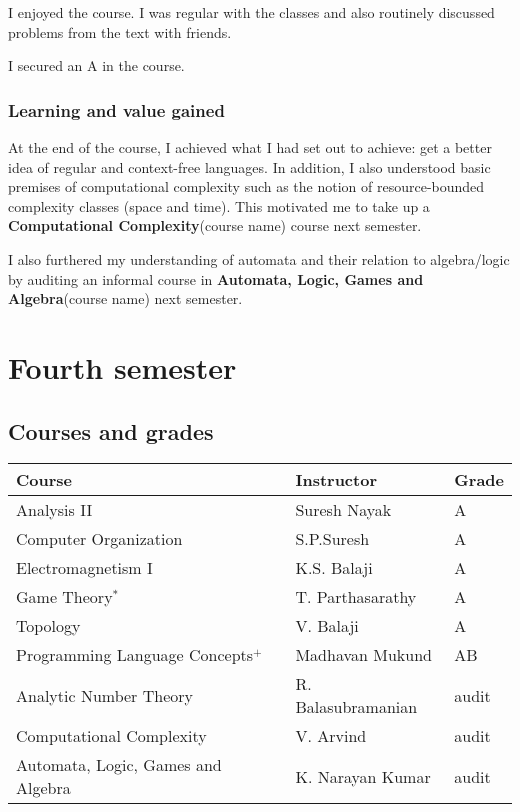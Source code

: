 \documentclass[a4paper]{amsart}
\newcommand{\coursename}[1]{{\bf #1}{\small{(course name)}}}
\begin{document}
I enjoyed the course. I was regular with the classes and also
routinely discussed problems from the text with friends.

I secured an A in the course.

\subsubsection{Learning and value gained}

At the end of the course, I achieved what I had set out to achieve:
get a better idea of regular and context-free languages. In addition,
I also understood basic premises of computational complexity such as
the notion of resource-bounded complexity classes (space and time).
This motivated me to take up a \coursename{Computational Complexity} course
next semester.

I also furthered my understanding of automata and their relation to
algebra/logic by auditing an informal course in \coursename{Automata, Logic, Games and Algebra} next semester.

\section{Fourth semester}

\subsection{Courses and grades}

\begin{tabular}{|l|l|l|}
  \hline
  Course & Instructor & Grade\\
  \hline
  Analysis II & Suresh Nayak & A\\
  Computer Organization & S.P.Suresh & A\\
  Electromagnetism I & K.S. Balaji & A\\
  Game Theory$^*$ & T. Parthasarathy & A\\
  Topology & V. Balaji & A\\
  Programming Language Concepts$^+$ & Madhavan Mukund & AB\\
  Analytic Number Theory & R. Balasubramanian & audit\\
  Computational Complexity & V. Arvind & audit\\
  Automata, Logic, Games and Algebra & K. Narayan Kumar & audit\\
  \hline
\end{tabular}
\end{document}
